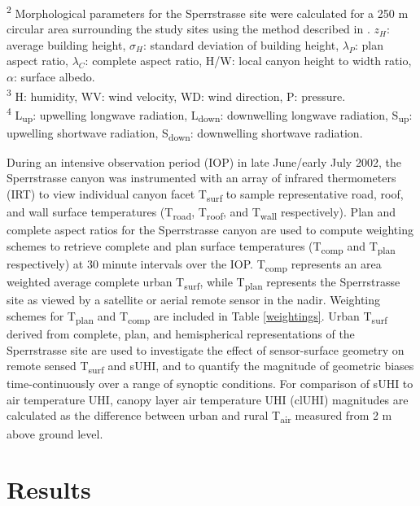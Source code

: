 \begin{table}[H]
\begin{tabular*}{\textwidth}{p{3.75cm} p{2.25cm}p{3.5cm}p{2.75cm}p{2.75cm}}
		\bottomrule
	\end{tabular*} 
		\raggedright
		\textsuperscript{2} Morphological parameters for the Sperrstrasse site were calculated for a 250 \si{\meter} circular area surrounding the study sites using the method described in \cite{Grimmond1999}. $z_H$: average building height, $\sigma_H $: standard deviation of building height, $\lambda_P $: plan aspect ratio, $\lambda_C $: complete aspect ratio, H/W: local canyon height to width ratio, $\alpha$: surface albedo. \\
		\textsuperscript{3} H: humidity, WV: wind velocity, WD: wind direction, P: pressure. \\
		\textsuperscript{4} L\textsubscript{up}: upwelling longwave radiation, L\textsubscript{down}: downwelling longwave radiation, S\textsubscript{up}: upwelling shortwave radiation, S\textsubscript{down}: downwelling shortwave radiation.
\end{table}

During an intensive observation period (IOP) in late June/early July 2002, the Sperrstrasse canyon was instrumented with an array of infrared thermometers (IRT) to view individual canyon facet T\textsubscript{surf} to sample representative road, roof, and wall surface temperatures (T\textsubscript{road}, T\textsubscript{roof}, and T\textsubscript{wall} respectively). Plan and complete aspect ratios for the Sperrstrasse canyon are used to compute weighting schemes to retrieve complete and plan surface temperatures (T\textsubscript{comp} and T\textsubscript{plan} respectively) at 30 minute intervals over the IOP. T\textsubscript{comp} represents an area weighted average complete urban T\textsubscript{surf}, while T\textsubscript{plan} represents the Sperrstrasse site as viewed by a satellite or aerial remote sensor in the nadir. Weighting schemes for T\textsubscript{plan} and T\textsubscript{comp} are included in Table \ref{weightings}. Urban T\textsubscript{surf} derived from complete, plan, and hemispherical representations of the Sperrstrasse site are used to investigate the effect of sensor-surface geometry on remote sensed T\textsubscript{surf} and sUHI, and to quantify the magnitude of geometric biases time-continuously over a range of synoptic conditions. For comparison of sUHI to air temperature UHI, canopy layer air temperature UHI (clUHI) magnitudes are calculated as the difference between urban and rural T\textsubscript{air} measured from 2 \si{\meter} above ground level.

\section{Results}

